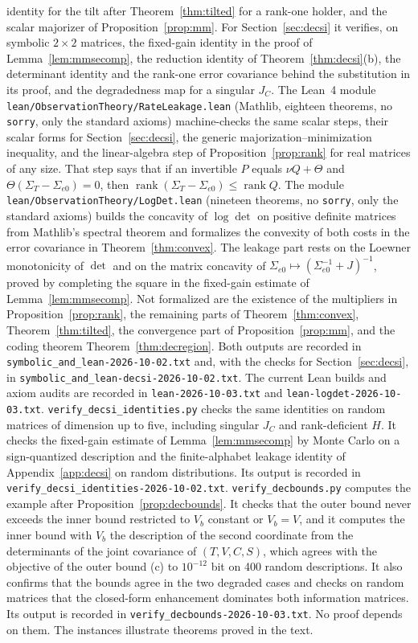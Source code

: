 \documentclass[11pt,onecolumn]{IEEEtran}
\newcommand{\Sez}{\Sigma_{e0}}
\begin{document}
identity for the tilt after Theorem~\ref{thm:tilted} for a rank-one holder,
and the scalar majorizer of Proposition~\ref{prop:mm}. For
Section~\ref{sec:decsi} it verifies, on symbolic $2\times2$ matrices, the
fixed-gain identity in the proof of Lemma~\ref{lem:mmsecomp}, the
reduction identity of Theorem~\ref{thm:decsi}(b), the determinant identity
and the rank-one error covariance behind the substitution in its proof,
and the degradedness map for a singular $J_C$. The Lean~4 module
\texttt{lean/ObservationTheory/RateLeakage.lean} (Mathlib, eighteen
theorems, no \texttt{sorry}, only the standard axioms) machine-checks the
same scalar steps, their scalar forms for Section~\ref{sec:decsi}, the
generic majorization--minimization inequality, and the linear-algebra
step of Proposition~\ref{prop:rank} for real matrices of any size. That
step says that if an invertible $P$ equals $\nu Q+\Theta$ and
$\Theta(\Sigma_T-\Sez)=0$, then $\operatorname{rank}(\Sigma_T-\Sez)\le\operatorname{rank}Q$.
The module \texttt{lean/ObservationTheory/LogDet.lean} (nineteen
theorems, no \texttt{sorry}, only the standard axioms) builds the
concavity of $\log\det$ on positive definite matrices from Mathlib's
spectral theorem and formalizes the convexity of both costs in the error
covariance in Theorem~\ref{thm:convex}. The leakage part rests on the
Loewner monotonicity of $\det$ and on the matrix concavity of
$\Sez\mapsto(\Sez^{-1}+J)^{-1}$, proved by completing the square in the
fixed-gain estimate of Lemma~\ref{lem:mmsecomp}. Not formalized are the
existence of the multipliers in Proposition~\ref{prop:rank}, the
remaining parts of Theorem~\ref{thm:convex}, Theorem~\ref{thm:tilted},
the convergence part of Proposition~\ref{prop:mm}, and the coding theorem
Theorem~\ref{thm:decregion}. Both outputs are recorded
in \texttt{symbolic\_and\_lean-2026-10-02.txt} and, with the checks for
Section~\ref{sec:decsi}, in \texttt{symbolic\_and\_lean-decsi-2026-10-02.txt}.
The current Lean builds and axiom audits are recorded in
\texttt{lean-2026-10-03.txt} and \texttt{lean-logdet-2026-10-03.txt}.
\texttt{verify\_decsi\_identities.py} checks the same identities on random
matrices of dimension up to five, including singular $J_C$ and
rank-deficient $H$. It checks the fixed-gain estimate of
Lemma~\ref{lem:mmsecomp} by Monte Carlo on a sign-quantized description
and the finite-alphabet leakage identity of Appendix~\ref{app:decsi} on
random distributions. Its output is recorded in
\texttt{verify\_decsi\_identities-2026-10-02.txt}.
\texttt{verify\_decbounds.py} computes the example after
Proposition~\ref{prop:decbounds}. It checks that the outer bound never
exceeds the inner bound restricted to $V_b$ constant or $V_b=V$, and it
computes the inner bound with $V_b$ the description of the second
coordinate from the determinants of the joint covariance of
$(T,V,C,S)$, which agrees with the objective of the outer bound (c) to
$10^{-12}$ bit on 400 random descriptions. It also confirms that the bounds agree in the two
degraded cases and checks on random matrices that the closed-form
enhancement dominates both information matrices. Its output is recorded
in \texttt{verify\_decbounds-2026-10-03.txt}. No proof depends on them. The instances
illustrate theorems proved in the text.
\end{document}
